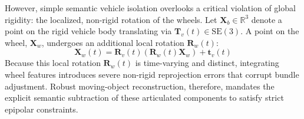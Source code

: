 \documentclass[letterpaper, 10 pt, conference]{ieeeconf}  %
\begin{document}
However, simple semantic vehicle isolation overlooks a critical violation of global rigidity: the localized, non-rigid rotation of the wheels. Let $\mathbf{X}_b \in \mathbb{R}^3$ denote a point on the rigid vehicle body translating via $\mathbf{T}_{v}(t) \in \mathrm{SE}(3)$. A point on the wheel, $\mathbf{X}_w$, undergoes an additional local rotation $\mathbf{R}_{w}(t)$:
\begin{equation}
    \mathbf{X}_w(t) = \mathbf{R}_{v}(t) \left( \mathbf{R}_{w}(t) \mathbf{X}_w \right) + \mathbf{t}_{v}(t)
\end{equation}
Because this local rotation $\mathbf{R}_{w}(t)$ is time-varying and distinct, integrating wheel features introduces severe non-rigid reprojection errors that corrupt bundle adjustment. Robust moving-object reconstruction, therefore, mandates the explicit semantic subtraction of these articulated components to satisfy strict epipolar constraints.












\end{document}
